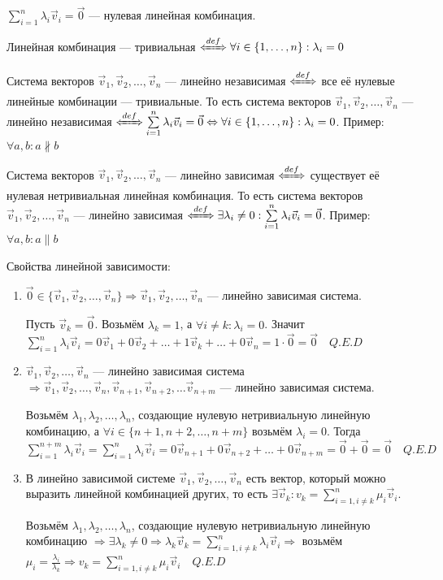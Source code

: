 \documentclass[twoside]{book}
\newcommand{\defLeftrightarrow}{\xLeftrightarrow{def}}
\begin{document}
\(\sum\limits_{i = 1}^{n} \lambda_i \vec v_i = \vec 0\) --- нулевая линейная комбинация.

Линейная комбинация --- тривиальная \(\defLeftrightarrow \forall i \in \{1, \dots, n\}: \lambda_i = 0\)

Система векторов \(\vec v_1, \vec v_2, \dots, \vec v_n\) --- линейно независимая \(\defLeftrightarrow\) все её нулевые линейные комбинации --- тривиальные. То есть система векторов \(\vec v_1, \vec v_2, \dots, \vec v_n\) --- линейно независимая \(\defLeftrightarrow \sum\limits_{i = 1}^{n} \lambda_i \vec v_i = \vec 0 \Leftrightarrow \forall i \in \{1, \dots, n\}: \lambda_i = 0\). Пример: \(\forall a, b : a \nparallel b\)

Система векторов \(\vec v_1, \vec v_2, \dots, \vec v_n\) --- линейно зависимая \(\defLeftrightarrow\) существует её нулевая нетривиальная линейная комбинация. То есть система векторов \(\vec v_1, \vec v_2, \dots, \vec v_n\) --- линейно зависимая \(\defLeftrightarrow \exists \lambda_i \neq 0:\sum\limits_{i = 1}^{n} \lambda_i \vec v_i = \vec 0\). Пример: \(\forall a, b : a \parallel b\)

Свойства линейной зависимости:
\begin{enumerate}
    \item \(\vec 0 \in \{\vec v_1, \vec v_2, \dots, \vec v_n\} \Rightarrow \vec v_1, \vec v_2, \dots, \vec v_n\) --- линейно зависимая система.

          Пусть \(\vec v_k = \vec 0\). Возьмём \(\lambda_k = 1\), а \(\forall i \neq k: \lambda_i = 0\). Значит \(\sum\limits_{i = 1}^{n} \lambda_i \vec v_i = 0 \vec v_1 + 0 \vec v_2 + \dots + 1 \vec v_k + \dots + 0 \vec v_n = 1 \cdot \vec 0 = \vec 0 \quad Q.E.D\)

    \item \(\vec v_1, \vec v_2, \dots, \vec v_n\) --- линейно зависимая система \(\Rightarrow \vec v_1, \vec v_2, \dots, \vec v_n, \vec v_{n + 1}, \vec v_{n + 2}, \dots \vec v_{n + m}\) --- линейно зависимая система.

          Возьмём \(\lambda_1, \lambda_2, \dots, \lambda_n\), создающие нулевую нетривиальную линейную комбинацию, а \(\forall i \in \{n + 1, n + 2, \dots, n + m\}\) возьмём \(\lambda_i = 0\). Тогда \(\sum\limits_{i = 1}^{n + m} \lambda_i \vec v_i = \sum\limits_{i = 1}^{n} \lambda_i \vec v_i = 0 \vec v_{n + 1} + 0 \vec v_{n + 2} + \dots + 0 \vec v_{n + m} = \vec 0 + \vec 0 = \vec 0 \quad Q.E.D\)\\

    \item В линейно зависимой системе \(\vec v_1, \vec v_2, \dots, \vec v_n\) есть вектор, который можно выразить линейной комбинацией других, то есть \(\exists \vec v_k: v_k = \sum\limits_{i = 1, i \neq k}^{n} \mu_i \vec v_i\).

          Возьмём \(\lambda_1, \lambda_2, \dots, \lambda_n\), создающие нулевую нетривиальную линейную комбинацию \(\Rightarrow \exists \lambda_k \neq 0 \Rightarrow \lambda_k \vec v_k = \sum\limits_{i = 1, i \neq k}^{n} \lambda_i \vec v_i \Rightarrow\) возьмём \(\mu_i = \frac{\lambda_i}{\lambda_k} \Rightarrow v_k = \sum\limits_{i = 1, i \neq k}^{n} \mu_i \vec v_i \quad Q.E.D\)

\end{enumerate}
\end{document}
